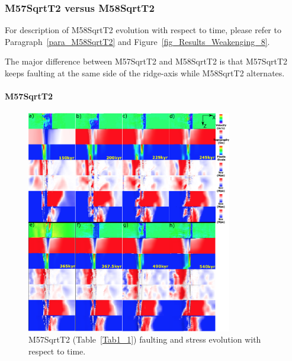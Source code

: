 \subsubsection{M57SqrtT2 versus M58SqrtT2}

For description of M58SqrtT2 evolution with respect to time, please refer to Paragraph~\hyperref[para_M58SqrtT2]{\ref{para_M58SqrtT2}} and Figure~\hyperref[fig_Results_Weakenging_8]{\ref{fig_Results_Weakenging_8}}.

The major difference between M57SqrtT2 and M58SqrtT2 is that M57SqrtT2 keeps faulting at the same side of the ridge-axis while M58SqrtT2 alternates.

\paragraph{M57SqrtT2}

\begin{figure}[h]
 \centering
  \includegraphics[width=0.8\textwidth]{fig_Results_MRange_3_M57SqrtT2_time_evolution.eps}
 \caption{M57SqrtT2 (Table~\hyperref[Tab1_1]{\ref{Tab1_1}}) faulting and stress evolution with respect to time.}
\label{fig_Results_MRange_3}
\end{figure}

